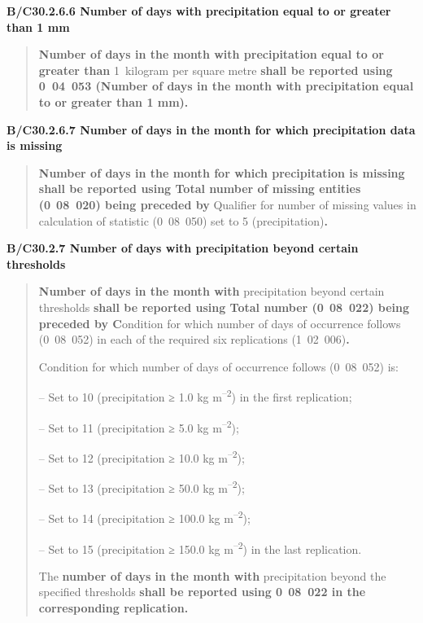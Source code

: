 \textbf{B/C30.2.6.6 Number of days with precipitation equal to or greater than 1 mm}

\begin{quote}
\textbf{Number of days in the month with precipitation equal to or greater than} 1~kilogram per square metre \textbf{shall be reported using 0~04~053 (Number of days in the month with precipitation equal to or greater than 1 mm).}
\end{quote}

\textbf{B/C30.2.6.7 Number of days in the month for which precipitation data is missing}

\begin{quote}
\textbf{Number of days in the month for which precipitation is missing shall be reported using Total number of missing entities (0}~\textbf{08~020) being preceded by} Qualifier for number of missing values in calculation of statistic (0~08~050) set to 5 (precipitation)\textbf{.}
\end{quote}

\textbf{B/C30.2.7 Number of days with precipitation beyond certain thresholds}

\begin{quote}
\textbf{Number of days in the month with} precipitation beyond certain thresholds \textbf{shall be reported using Total number (0}~\textbf{08~022) being preceded by C}ondition for which number of days of occurrence follows (0~08~052) in each of the required six replications (1~02~006)\textbf{.}

Condition for which number of days of occurrence follows (0~08~052) is:

-- Set to 10 (precipitation ≥ 1.0 kg m\textsuperscript{--2}) in the first replication;

-- Set to 11 (precipitation ≥ 5.0 kg m\textsuperscript{--2});

-- Set to 12 (precipitation ≥ 10.0 kg m\textsuperscript{--2});

-- Set to 13 (precipitation ≥ 50.0 kg m\textsuperscript{--2});

-- Set to 14 (precipitation ≥ 100.0 kg m\textsuperscript{--2});

-- Set to 15 (precipitation ≥ 150.0 kg m\textsuperscript{--2}) in the last replication.

The \textbf{number of days in the month with} precipitation beyond the specified thresholds \textbf{shall be reported using 0}~\textbf{08~022 in the corresponding replication.}
\end{quote}

